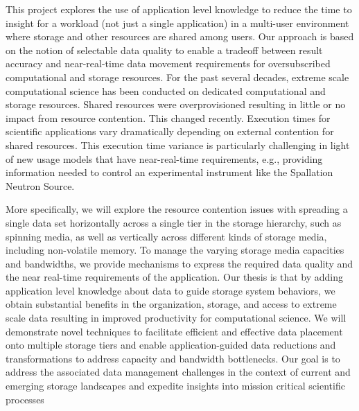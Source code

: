 This project explores the use of application level knowledge to reduce the
time to insight for a workload (not just a single application) in a
multi-user environment where storage and other resources are shared among
users. Our approach is based on the notion of selectable data quality to
enable a tradeoff between result accuracy and near-real-time data movement
requirements for oversubscribed computational and storage resources. For the
past several decades, extreme scale computational science has been conducted
on dedicated computational and storage resources. Shared resources were
overprovisioned resulting in little or no impact from resource contention.
This changed recently. Execution times for scientific applications vary
dramatically depending on external contention for shared resources. This
execution time variance is particularly challenging in light of new usage
models that have near-real-time requirements, e.g., providing information
needed to control an experimental instrument like the Spallation Neutron
Source. 

More specifically, we will explore the resource contention issues
with spreading a single data set horizontally across a single tier in the
storage hierarchy, such as spinning media, as well as vertically across
different kinds of storage media, including non-volatile memory. To manage
the varying storage media capacities and bandwidths, we provide mechanisms
to express the required data quality and the near real-time requirements of
the application. Our thesis is that by adding application level knowledge
about data to guide storage system behaviors, we obtain substantial benefits
in the organization, storage, and access to extreme scale data resulting in
improved productivity for computational science. We will demonstrate novel
techniques to facilitate efficient and effective data placement onto
multiple storage tiers and enable application-guided data reductions and
transformations to address capacity and bandwidth bottlenecks. Our goal is
to address the associated data management challenges in the context of
current and emerging storage landscapes and expedite insights into mission
critical scientific processes

\noindent

\vfill
